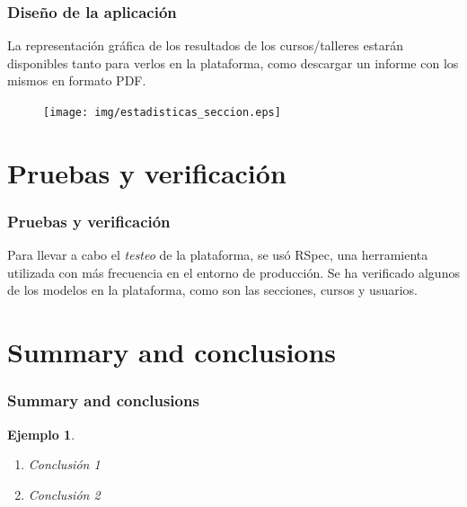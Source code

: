 \documentclass{beamer}
\newtheorem{ejemplo}{Ejemplo}
\begin{document}
\begin{frame}
\frametitle{Diseño de la aplicación}

La representación gráfica de los resultados de los cursos/talleres estarán disponibles tanto para verlos en la plataforma, como descargar un informe con los mismos en formato PDF.

\begin{figure}
    \texttt{[image: img/estadisticas\_seccion.eps]}
\end{figure}

\end{frame}


\section{Pruebas y verificación}
\begin{frame}
\frametitle{Pruebas y verificación}

Para llevar a cabo el \textit{testeo} de la plataforma, se usó RSpec, una herramienta utilizada con más frecuencia en el entorno de producción. Se ha verificado algunos de los modelos en la plataforma,
como son las secciones, cursos y usuarios.

\begin{figure}[!th]%
    \centering
    \qquad
\end{figure}

\end{frame}

\section{Summary and conclusions}

\begin{frame}
\frametitle{Summary and conclusions}

\begin{ejemplo}
  \begin{enumerate}
    \item
      Conclusión 1
      \pause
    \item
      Conclusión 2
  \end{enumerate}
\end{ejemplo}

\end{frame}
\end{document}
